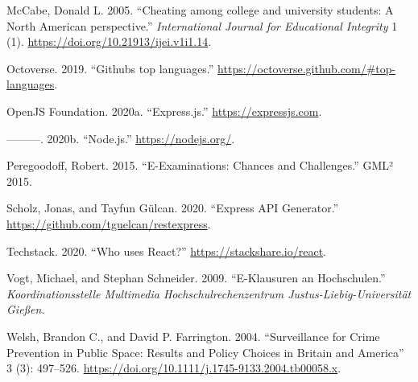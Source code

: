 \begin{cslreferences}
\leavevmode\hypertarget{ref-Mccabe2005}{}%
McCabe, Donald L. 2005. ``Cheating among college and university
students: A North American perspective.'' \emph{International Journal
for Educational Integrity} 1 (1).
\url{https://doi.org/10.21913/ijei.v1i1.14}.

\leavevmode\hypertarget{ref-Octoverse}{}%
Octoverse. 2019. ``Githubs top languages.''
\url{https://octoverse.github.com/\#top-languages}.

\leavevmode\hypertarget{ref-Express}{}%
OpenJS Foundation. 2020a. ``Express.js.'' \url{https://expressjs.com}.

\leavevmode\hypertarget{ref-Node}{}%
---------. 2020b. ``Node.js.'' \url{https://nodejs.org/}.

\leavevmode\hypertarget{ref-GLM2015}{}%
Peregoodoff, Robert. 2015. ``E-Examinations: Chances and Challenges.''
GML² 2015.

\leavevmode\hypertarget{ref-Scholz}{}%
Scholz, Jonas, and Tayfun Gülcan. 2020. ``Express API Generator.''
\url{https://github.com/tguelcan/restexpress}.

\leavevmode\hypertarget{ref-Techstack}{}%
Techstack. 2020. ``Who uses React?'' \url{https://stackshare.io/react}.

\leavevmode\hypertarget{ref-Vogt2009}{}%
Vogt, Michael, and Stephan Schneider. 2009. ``E-Klausuren an
Hochschulen.'' \emph{Koordinationsstelle Multimedia
Hochschulrechenzentrum Justus-Liebig-Universität Gießen}.

\leavevmode\hypertarget{ref-WELSH2004}{}%
Welsh, Brandon C., and David P. Farrington. 2004. ``Surveillance for
Crime Prevention in Public Space: Results and Policy Choices in Britain
and America'' 3 (3): 497--526.
\url{https://doi.org/10.1111/j.1745-9133.2004.tb00058.x}.
\end{cslreferences}
